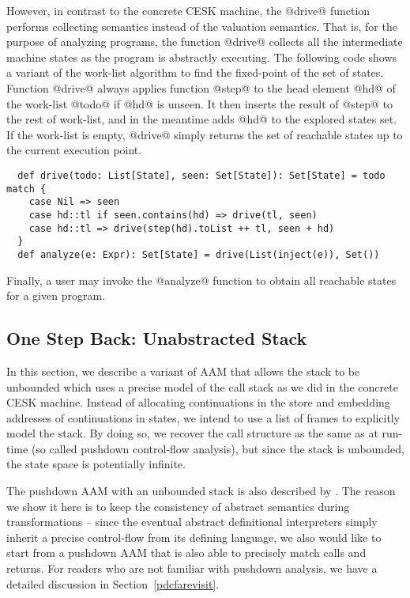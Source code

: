 \documentclass[acmsmall, review]{acmart}\settopmatter{}
\begin{document}
However, in contrast to the concrete CESK machine, the @drive@ function performs 
collecting semantics instead of the valuation semantics. That is, for the purpose of
analyzing programs, the function @drive@ collects all the intermediate machine states 
as the program is abstractly executing. The following code shows a variant of the 
work-list algorithm to find the fixed-point of the set of states.
Function @drive@ always applies function @step@ to the head element @hd@ of
the work-list @todo@ if @hd@ is unseen. It then inserts the result of @step@ to
the rest of work-list, and in the meantime adds @hd@ to the explored states set.
If the work-list is empty, @drive@ simply returns the set of reachable states
up to the current execution point.

\begin{lstlisting}
  def drive(todo: List[State], seen: Set[State]): Set[State] = todo match {
    case Nil => seen
    case hd::tl if seen.contains(hd) => drive(tl, seen)
    case hd::tl => drive(step(hd).toList ++ tl, seen + hd)
  }
  def analyze(e: Expr): Set[State] = drive(List(inject(e)), Set())
\end{lstlisting}

Finally, a user may invoke the @analyze@ function to obtain all reachable states for 
a given program.


\subsection{One Step Back: Unabstracted Stack} \label{unabs}

In this section, we describe a variant of AAM that allows the stack to be unbounded 
which uses a precise model of the call stack as we did in the concrete CESK machine.
Instead of allocating continuations in the store and embedding addresses of 
continuations in states, we intend to use a list of frames to explicitly model 
the stack. By doing so, we recover the call structure as the same as at run-time
(so called pushdown control-flow analysis), but since the stack is unbounded, 
the state space is potentially infinite. 

The pushdown AAM with an unbounded stack is also described by \citeauthor{van2012systematic} 
\cite{van2012systematic}. 
The reason we show it here is to keep the consistency of abstract semantics during 
transformations -- since the eventual abstract definitional interpreters simply inherit
a precise control-flow from its defining language, we also would like to start from a
pushdown AAM that is also able to precisely match calls and returns.
For readers who are not familiar with pushdown analysis, we have a detailed discussion 
in Section~\ref{pdcfarevisit}.
\end{document}
